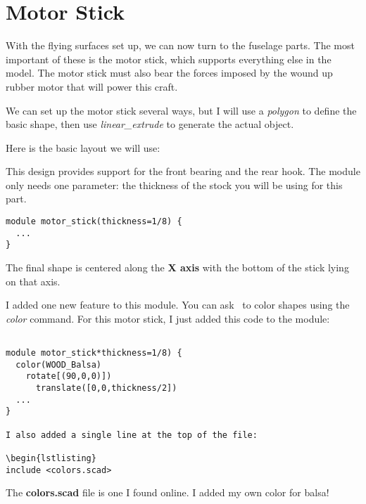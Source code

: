 \section{Motor Stick}

With the flying surfaces set up, we can now turn to the fuselage parts. The
most important of these is the motor stick, which supports everything else in
the model. The motor stick must also bear the forces imposed by the wound up
rubber motor that will power this craft.

We can set up the motor stick several ways, but I will use a {\it polygon} to
define the basic shape, then use {\it linear\_extrude} to generate the actual
object.

Here is the basic layout we will use:


This design provides support for the front bearing and the rear hook. The
module only needs one parameter: the thickness of the stock you will be using
for this part.

\begin{lstlisting}
module motor_stick(thickness=1/8) {
  ...
}
\end{lstlisting}

The final shape is centered along the {\bf X axis} with the bottom of the stick
lying on that axis.


I added one new feature to this module. You can ask \osc\ to color shapes using
the {\it color} command. For this motor stick, I just added this code to the
module:

\begin{lstlisting}

module motor_stick*thickness=1/8) {
  color(WOOD_Balsa)
    rotate[(90,0,0)])
      translate([0,0,thickness/2])
  ...
}

I also added a single line at the top of the file:

\begin{lstlisting}
include <colors.scad>
\end{lstlisting}

The {\bf colors.scad} file is one I found online. I added my own color for balsa!

